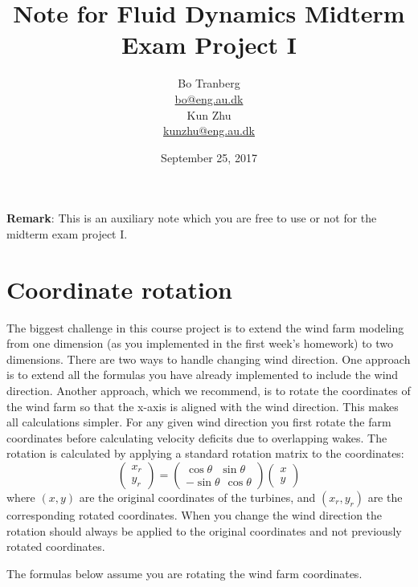 \documentclass[a4paper, 11pt]{article}
\title{Note for Fluid Dynamics Midterm Exam Project I}
\author{Bo Tranberg\\\href{mailto:bo@eng.au.dk}{\small bo@eng.au.dk}\medskip\\ Kun Zhu\\\href{mailto:kunzhu@eng.au.dk}{\small kunzhu@eng.au.dk}}
\date{September 25, 2017}
\begin{document}
\maketitle

\large{
	\textbf{Remark}: This is an auxiliary note which you are free to use or not for the midterm exam project I. 
	}

\section{Coordinate rotation}
The biggest challenge in this course project is to extend the wind farm modeling from one dimension (as you implemented in the first week's homework) to two dimensions. There are two ways to handle changing wind direction. One approach is to extend all the formulas you have already implemented to include the wind direction. Another approach, which we recommend, is to rotate the coordinates of the wind farm so that the x-axis is aligned with the wind direction. This makes all calculations simpler. For any given wind direction you first rotate the farm coordinates before calculating velocity deficits due to overlapping wakes. The rotation is calculated by applying a standard rotation matrix to the coordinates:
\begin{equation}
	\begin{pmatrix}
	x_r \\
	y_r
	\end{pmatrix}
	=
	\begin{pmatrix}
	\cos \theta \ \ \  \sin \theta\\
	-\sin \theta \ \ \cos \theta
	\end{pmatrix}
	\begin{pmatrix}
	x \\
	y
	\end{pmatrix}
\end{equation}
where $(x,y)$ are the original coordinates of the turbines, and $(x_r,y_r)$ are the corresponding rotated coordinates. When you change the wind direction the rotation should always be applied to the original coordinates and not previously rotated coordinates.

The formulas below assume you are rotating the wind farm coordinates.
\end{document}
